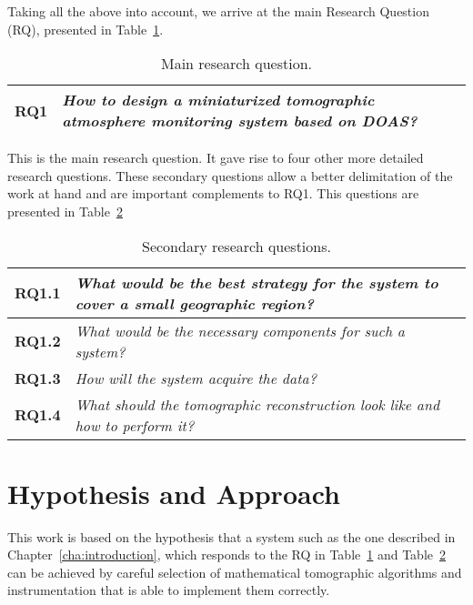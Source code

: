 Taking all the above into account, we arrive at the main Research
Question (\gls{RQ}), presented in Table~\ref{tab:RQ1}.
\begin{table}[htpb]
    \centering
    \caption{Main research question.}
    \label{tab:RQ1}
    \begin{tabularx}{0.8\textwidth}{cX}
        \toprule
        \textbf{RQ1}&\emph{ How to design a miniaturized tomographic
        atmosphere monitoring system based on DOAS? }\\
        \bottomrule
    \end{tabularx}
\end{table}

This is the main research question. It gave rise to four other more
detailed research questions. These secondary questions allow a better
delimitation of the work at hand and are important complements to RQ1.
This questions are presented in Table~\ref{tab:sec_RQ}

\begin{table}[htpb]
    \centering
    \caption{Secondary research questions.}
    \label{tab:sec_RQ}
    \begin{tabularx}{0.8\textwidth}{cX}
        \toprule
        \textbf{RQ1.1}&\emph{ What would be the best strategy
        for the system to cover a small geographic region? }\\
        \midrule
        \textbf{RQ1.2}&\emph{ What would be the necessary
        components for such a system? }\\
        \midrule
        \textbf{RQ1.3}&\emph{ How will the system acquire the
        data? }\\
        \midrule
        \textbf{RQ1.4}&\emph{ What should the tomographic
        reconstruction look like and how to perform it? }\\
        \bottomrule
    \end{tabularx}
\end{table}



\section{Hypothesis and Approach}%
\label{sec:hypothesis_and_approach}

This work is based on the hypothesis that a system such as the one
described in Chapter~\ref{cha:introduction}, which responds to the
\gls{RQ} in Table~\ref{tab:RQ1} and Table~\ref{tab:sec_RQ} can be
achieved by careful selection of mathematical tomographic algorithms and
instrumentation that is able to implement them correctly.

